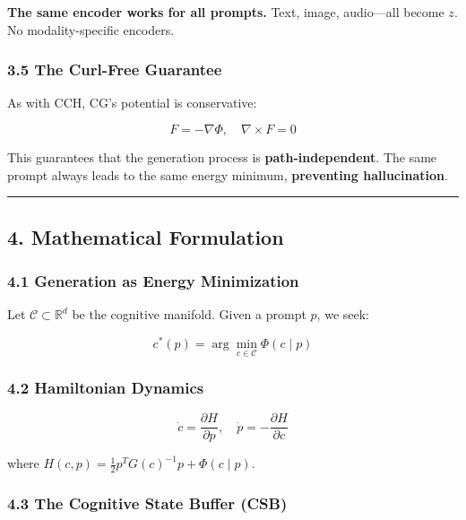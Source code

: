 \documentclass[
  11pt,
  a4paper,
]{article}
\begin{document}
\textbf{The same encoder works for all prompts.} Text, image,
audio---all become \(z\). No modality-specific encoders.

\subsubsection{3.5 The Curl-Free
Guarantee}\label{the-curl-free-guarantee}

As with CCH, CG's potential is conservative:

\[
F = -\nabla\Phi, \quad \nabla \times F = 0
\]

This guarantees that the generation process is
\textbf{path-independent}. The same prompt always leads to the same
energy minimum, \textbf{preventing hallucination}.

\begin{center}\rule{0.5\linewidth}{0.5pt}\end{center}

\subsection{4. Mathematical Formulation}\label{mathematical-formulation}

\subsubsection{4.1 Generation as Energy
Minimization}\label{generation-as-energy-minimization-1}

Let \(\mathcal{C} \subset \mathbb{R}^d\) be the cognitive manifold.
Given a prompt \(p\), we seek:

\[
c^*(p) = \arg\min_{c \in \mathcal{C}} \Phi(c \mid p)
\]

\subsubsection{4.2 Hamiltonian Dynamics}\label{hamiltonian-dynamics}

\[
\dot{c} = \frac{\partial H}{\partial p}, \quad \dot{p} = -\frac{\partial H}{\partial c}
\]

where \(H(c, p) = \frac{1}{2} p^T G(c)^{-1} p + \Phi(c \mid p)\).

\subsubsection{4.3 The Cognitive State Buffer
(CSB)}\label{the-cognitive-state-buffer-csb}
\end{document}
